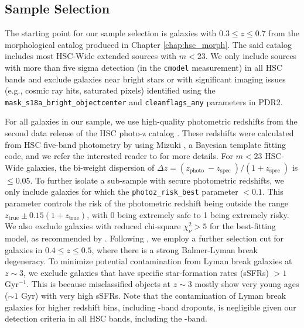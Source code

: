 \subsection{Sample Selection} \label{sec_c4:sample_selection}
The starting point for our sample selection is galaxies with $0.3 \leq z \leq 0.7$ from the morphological catalog produced in Chapter \ref{chap:hsc_morph}. The said catalog includes most HSC-Wide extended sources with $m < 23$. We only include sources with more than five sigma detection (in the \texttt{cmodel} measurement) in all HSC bands and exclude galaxies near bright stars or with significant imaging issues (e.g., cosmic ray hits, saturated pixels) identified using the \texttt{mask\_s18a\_bright\_objectcenter} and \texttt{cleanflags\_any} parameters in PDR2. 

For all galaxies in our sample, we use high-quality photometric redshifts from the second data release of the HSC photo-z catalog \citep{photoz_hsc_pdr2}. These redshifts were calculated from HSC five-band photometry by using Mizuki \citep{mizuki}, a Bayesian template fitting code, and we refer the interested reader to \citet{photoz_hsc_pdr2} for more details. For $m < 23$ HSC-Wide galaxies, the bi-weight dispersion of $\Delta z=\left(z_{\text {photo }}-z_{\text {spec }}\right) /\left(1+z_{\text {spec }}\right)$ is $\leq 0.05$. To further isolate a sub-sample with secure photometric redshifts, we only include galaxies for which the \texttt{photoz\_risk\_best} parameter $<0.1$. This parameter controls the risk of the photometric redshift being outside the range $z_{\mathrm{true}} \pm 0.15(1+z_{\mathrm{true}})$, with 0 being extremely safe to 1 being extremely risky. We also exclude galaxies with reduced chi-square $\chi_{\nu}^2 > 5$ for the best-fitting model, as recommended by \citet{photoz_hsc_pdr2}. Following \citet{hsc_den}, we employ a further selection cut for galaxies in $0.4 \leq z \leq 0.5$, where there is a strong Balmer-Lyman break degeneracy. To minimize potential contamination from Lyman break galaxies at $z\sim3$, we exclude galaxies that have specific star-formation rates (sSFRs)  $> 1$ Gyr$^{-1}$. This is because misclassified objects at $z\sim3$ mostly show very young ages ($\sim 1$ Gyr) with very high sSFRs. Note that the contamination of Lyman break galaxies for higher redshift bins, including \ib-band dropouts, is negligible given our detection criteria in all HSC bands, including the \gb-band. 

